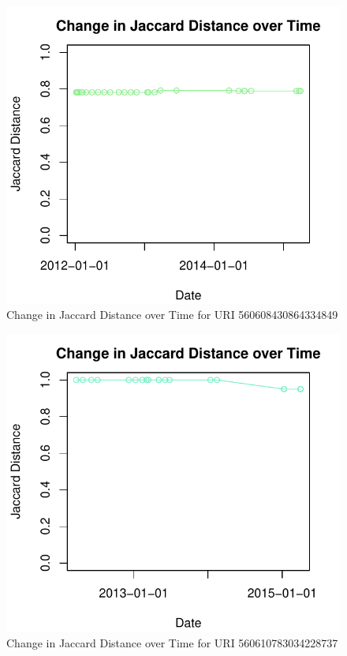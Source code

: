 \documentclass[a4paper,12pt]{article}
\begin{document}
\begin{figure}[H]
    \centering
    \includegraphics{stats/q3/560608430864334849.pdf}
    \caption{Change in Jaccard Distance over Time for URI 560608430864334849}
\end{figure}

\begin{figure}[H]
    \centering
    \includegraphics{stats/q3/560610783034228737.pdf}
    \caption{Change in Jaccard Distance over Time for URI 560610783034228737}
\end{figure}
\end{document}
